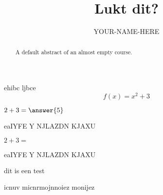 \documentclass{ximera}
\title{Lukt dit?}
\author{YOUR-NAME-HERE}
\begin{document}
\begin{abstract}
    A default abstract of an almost empty course.
\end{abstract}
\maketitle

\begin{example}
    ehibc ljbce 
    \[ f(x)=x^2+3 \]
\end{example}

\begin{exercise}
    $2+3=\answer{5}$
    \begin{solution}
        eaIYFE Y NJLAZDN KJAXU
    \end{solution}
\end{exercise}
\begin{exercise}
    $2+3=$
    \begin{oplossing}[toon]
        eaIYFE Y NJLAZDN KJAXU
    \end{oplossing}
\end{exercise}

\begin{definition}
    dit is een test
\end{definition}

\begin{remark}
    icnuv micnrmojnnoiez monijez
\end{remark}
\end{document}

